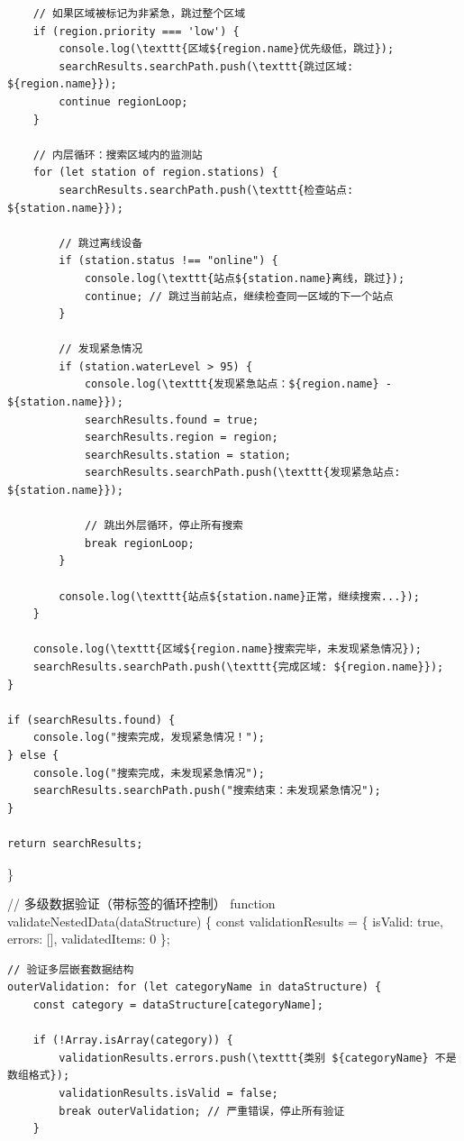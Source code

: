 {\begin{verbatim}
    // 如果区域被标记为非紧急，跳过整个区域
    if (region.priority === 'low') {
        console.log(\texttt{区域${region.name}优先级低，跳过});
        searchResults.searchPath.push(\texttt{跳过区域: ${region.name}});
        continue regionLoop;
    }
    
    // 内层循环：搜索区域内的监测站
    for (let station of region.stations) {
        searchResults.searchPath.push(\texttt{检查站点: ${station.name}});
        
        // 跳过离线设备
        if (station.status !== "online") {
            console.log(\texttt{站点${station.name}离线，跳过});
            continue; // 跳过当前站点，继续检查同一区域的下一个站点
        }
        
        // 发现紧急情况
        if (station.waterLevel > 95) {
            console.log(\texttt{发现紧急站点：${region.name} - ${station.name}});
            searchResults.found = true;
            searchResults.region = region;
            searchResults.station = station;
            searchResults.searchPath.push(\texttt{发现紧急站点: ${station.name}});
            
            // 跳出外层循环，停止所有搜索
            break regionLoop;
        }
        
        console.log(\texttt{站点${station.name}正常，继续搜索...});
    }
    
    console.log(\texttt{区域${region.name}搜索完毕，未发现紧急情况});
    searchResults.searchPath.push(\texttt{完成区域: ${region.name}});
}

if (searchResults.found) {
    console.log("搜索完成，发现紧急情况！");
} else {
    console.log("搜索完成，未发现紧急情况");
    searchResults.searchPath.push("搜索结束：未发现紧急情况");
}

return searchResults;
\end{verbatim}

\}

// 多级数据验证（带标签的循环控制） function validateNestedData(dataStructure) \{ const validationResults = \{ isValid: true, errors: {[}{]}, validatedItems: 0 \};

\begin{verbatim}
// 验证多层嵌套数据结构
outerValidation: for (let categoryName in dataStructure) {
    const category = dataStructure[categoryName];
    
    if (!Array.isArray(category)) {
        validationResults.errors.push(\texttt{类别 ${categoryName} 不是数组格式});
        validationResults.isValid = false;
        break outerValidation; // 严重错误，停止所有验证
    }
    

\end{verbatim}}
